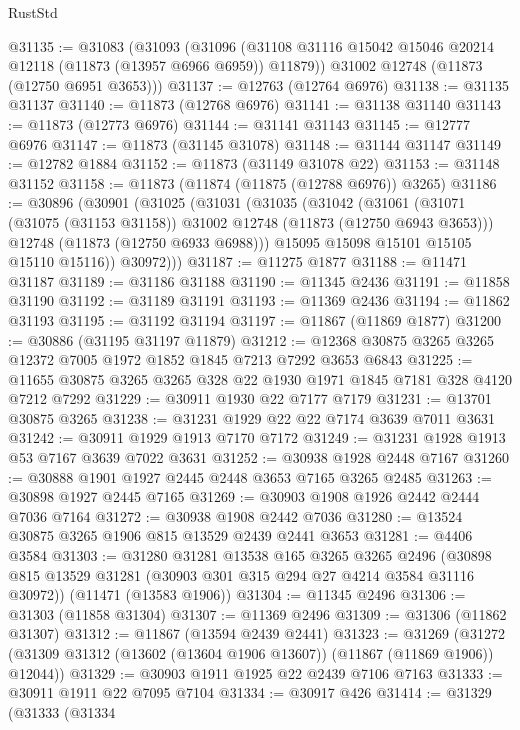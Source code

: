 \begin{lexlean}{RustStd}
\begin{coremodule}
@31135 := @31083
    (@31093
      (@31096 (@31108 @31116 @15042 @15046 @20214 @12118 (@11873 (@13957 @6966 @6959)) @11879))
      @31002
      @12748
      (@11873 (@12750 @6951 @3653)))
@31137 := @12763 (@12764 @6976)
@31138 := @31135 @31137
@31140 := @11873 (@12768 @6976)
@31141 := @31138 @31140
@31143 := @11873 (@12773 @6976)
@31144 := @31141 @31143
@31145 := @12777 @6976
@31147 := @11873 (@31145 @31078)
@31148 := @31144 @31147
@31149 := @12782 @1884
@31152 := @11873 (@31149 @31078 @22)
@31153 := @31148 @31152
@31158 := @11873 (@11874 (@11875 (@12788 @6976)) @3265)
@31186 := @30896
    (@30901
      (@31025
        (@31031
          (@31035
            (@31042
              (@31061
                (@31071 (@31075 (@31153 @31158)) @31002 @12748 (@11873 (@12750 @6943 @3653)))
                @12748
                (@11873 (@12750 @6933 @6988)))
              @15095
              @15098
              @15101
              @15105
              @15110
              @15116))
          @30972)))
@31187 := @11275 @1877
@31188 := @11471 @31187
@31189 := @31186 @31188
@31190 := @11345 @2436
@31191 := @11858 @31190
@31192 := @31189 @31191
@31193 := @11369 @2436
@31194 := @11862 @31193
@31195 := @31192 @31194
@31197 := @11867 (@11869 @1877)
@31200 := @30886 (@31195 @31197 @11879)
@31212 := @12368 @30875 @3265 @3265 @12372 @7005 @1972 @1852 @1845 @7213 @7292 @3653 @6843
@31225 := @11655 @30875 @3265 @3265 @328 @22 @1930 @1971 @1845 @7181 @328 @4120 @7212 @7292
@31229 := @30911 @1930 @22 @7177 @7179
@31231 := @13701 @30875 @3265
@31238 := @31231 @1929 @22 @22 @7174 @3639 @7011 @3631
@31242 := @30911 @1929 @1913 @7170 @7172
@31249 := @31231 @1928 @1913 @53 @7167 @3639 @7022 @3631
@31252 := @30938 @1928 @2448 @7167
@31260 := @30888 @1901 @1927 @2445 @2448 @3653 @7165 @3265 @2485
@31263 := @30898 @1927 @2445 @7165
@31269 := @30903 @1908 @1926 @2442 @2444 @7036 @7164
@31272 := @30938 @1908 @2442 @7036
@31280 := @13524 @30875 @3265 @1906 @815 @13529 @2439 @2441 @3653
@31281 := @4406 @3584
@31303 := @31280
    @31281
    @13538
    @165
    @3265
    @3265
    @2496
    (@30898 @815 @13529 @31281 (@30903 @301 @315 @294 @27 @4214 @3584 @31116 @30972))
    (@11471 (@13583 @1906))
@31304 := @11345 @2496
@31306 := @31303 (@11858 @31304)
@31307 := @11369 @2496
@31309 := @31306 (@11862 @31307)
@31312 := @11867 (@13594 @2439 @2441)
@31323 := @31269
    (@31272 (@31309 @31312 (@13602 (@13604 @1906 @13607)) (@11867 (@11869 @1906)) @12044))
@31329 := @30903 @1911 @1925 @22 @2439 @7106 @7163
@31333 := @30911 @1911 @22 @7095 @7104
@31334 := @30917 @426
@31414 := @31329
    (@31333
      (@31334

\end{coremodule}
\end{lexlean}
